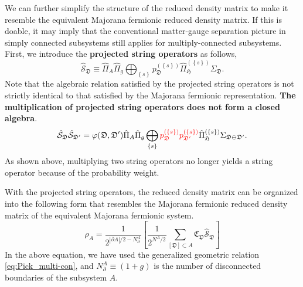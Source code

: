 \documentclass[12font]{article}
\theoremstyle{definition}
\newcommand{\lrm}[1]{\left[  #1  \right]}
\newcommand{\lrg}[1]{\left\{  #1  \right\}}
\newcommand{\abs}[1]{\left|  #1  \right|}
\newcommand{\de}{\partial}
\newcommand{\alert}[1]{{\color{red}#1}}
\begin{document}
We can further simplify the structure of the reduced density matrix to make it resemble the equivalent Majorana fermionic reduced density matrix. If this is doable, it may imply that the conventional matter-gauge separation picture in simply connected subsystems still applies for multiply-connected subsystems. First, we introduce the \textbf{projected string operators} as follows,
\begin{equation}\label{eq:S-rep_multi-connect}
    \hat{\mathcal{S}}_\mathfrak{D} 
    \equiv 
    \hat{\Pi}_A \hat{\Pi}_g
    \bigoplus_{\lrg{s}} p_\mathfrak{D}^{(\lrg{s})} \hat{\Pi}_\mathfrak{H}^{(\lrg{s})}\Sigma_\mathfrak{D}.
\end{equation}
Note that the algebraic relation satisfied by the projected string operators is not strictly identical to that satisfied by the Majorana fermionic representation. \textbf{\alert{The multiplication of projected string operators does not form a closed algebra}}.
\[
    \hat{\mathcal{S}}_\mathfrak{D} \hat{\mathcal{S}}_{\mathfrak{D}'} 
    = 
    \varphi(\mathfrak{D},\mathfrak{D}') 
    \hat{\Pi}_A \hat{\Pi}_g
    \bigoplus_{\lrg{s}} 
    \alert{p_\mathfrak{D}^{(\lrg{s})} p_{\mathfrak{D}'}^{(\lrg{s})}} 
    \hat{\Pi}_\mathfrak{H}^{(\lrg{s})}\Sigma_{\mathfrak{D}\ominus\mathfrak{D}'}.
\]
As shown above, multiplying two string operators no longer yields a string operator because of the probability weight. 

With the projected string operators, the reduced density matrix can be organized into the following form that resembles the Majorana fermionic reduced density matrix of the equivalent Majorana fermionic system. 
\begin{equation}\label{eq:RDM-norm}
    \rho_A
    =
    \frac{1}{2^{\abs{\de A}/2 - N^A_\de}}
    \lrm{
        \frac{1}{2^{N^A/2}}
        \sum_{[\mathfrak{D}]\subset A}
        \mathfrak{C}_\mathfrak{D} \hat{\mathcal{S}}_\mathfrak{D}
    }
\end{equation}
In the above equation, we have used the generalized geometric relation \eqref{eq:Pick_multi-con}, and $N^A_\de \equiv (1 + g)$ is the number of disconnected boundaries of the subsystem $A$.
\end{document}
